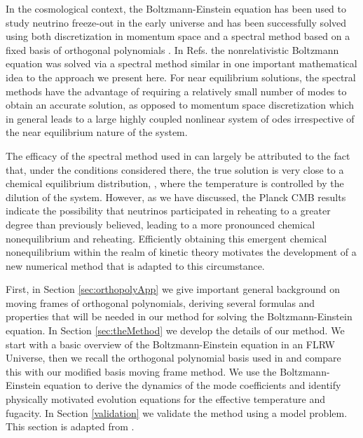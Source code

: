 In the cosmological context, the Boltzmann-Einstein equation has been used to study neutrino freeze-out in the early universe and has been successfully solved using both discretization in momentum space \cite{Hannestad:1995rs,Dolgov:1997mb,Dolgov:1998sf,Gnedin:1997vn,Mangano:2005cc} and a spectral method based on a fixed basis of orthogonal polynomials \cite{Esposito:2000hi,Mangano:2001iu}.    In Refs.\cite{Wilkening,Wilkening2} the nonrelativistic Boltzmann equation was solved via a spectral method similar in  one important mathematical idea to the approach we present here.  For near equilibrium solutions, the spectral methods have the advantage of requiring a relatively small number of modes to obtain an accurate solution, as opposed to momentum space discretization which in general leads to a large highly coupled nonlinear system of odes irrespective of the near equilibrium nature of the system.  

The efficacy of the spectral method used in \cite{Esposito:2000hi,Mangano:2001iu} can largely be attributed to the fact that, under the conditions considered there, the true solution is very close to a chemical equilibrium distribution, , where the temperature is controlled by the dilution of the system. However, as we have discussed, the Planck CMB results \cite{Planck:2013pxb} indicate the possibility that neutrinos participated in reheating to a greater degree than previously believed, leading to a more pronounced chemical nonequilibrium and reheating. Efficiently obtaining this emergent chemical nonequilibrium within the realm of kinetic theory motivates the development of a new numerical method that is adapted to this  circumstance.

 First, in  Section \ref{sec:orthopolyApp}  we give important general background on moving frames of orthogonal polynomials, deriving several formulas and properties that will be needed in our method for solving the Boltzmann-Einstein equation. In Section \ref{sec:theMethod} we develop the details of our method. We start with a basic overview of the Boltzmann-Einstein equation in an FLRW Universe, then we recall the orthogonal polynomial basis used in \cite{Esposito:2000hi,Mangano:2001iu} and compare this with our modified basis moving frame method.  We use the Boltzmann-Einstein equation to derive the dynamics of the mode coefficients and identify physically motivated evolution equations for the effective temperature and fugacity. In Section \ref{validation} we validate the method using a model problem. This section is adapted from \cite{Birrell:2014ona,Birrell:2014gea,Birrell:2014uka}.





